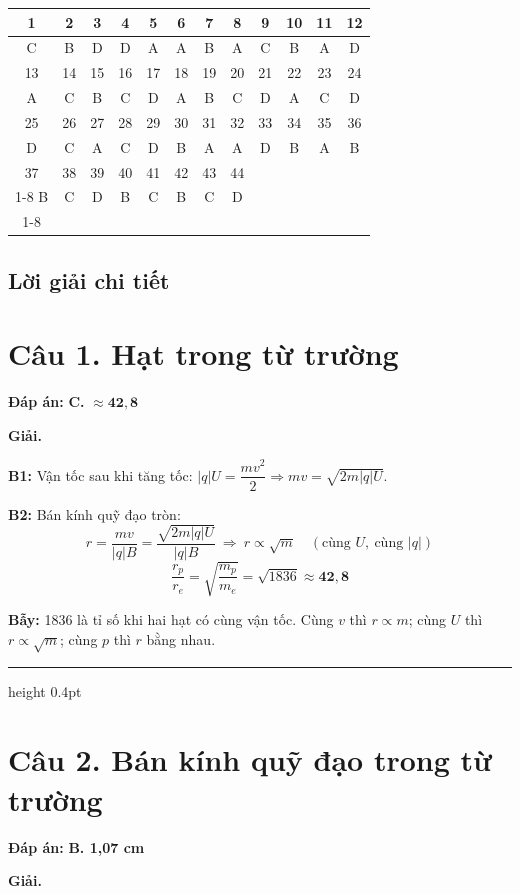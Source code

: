 \documentclass[11pt,a4paper]{article}
\renewcommand{\boldsymbol}[1]{\symbf{#1}}
\newcommand{\Cau}[2]{\par\Needspace{7\baselineskip}\section*{Câu #1. #2}}
\newcommand{\DapAn}[1]{\textbf{Đáp án:} #1\par}
\newcommand{\Bay}[1]{\par\textbf{Bẫy:} #1\par}
\newcommand{\PhanCachBai}{%
  \par\Needspace{7\baselineskip}%
  \addvspace{6pt}%
  {\color{black!40}\hrule height 0.4pt}%
  \nobreak\vspace{7pt}\nobreak
}
\begin{document}
\begin{center}
\renewcommand{\arraystretch}{1.35}
\setlength{\tabcolsep}{5pt}
\begin{tabular}{|c|c|c|c|c|c|c|c|c|c|c|c|}
\hline
1 & 2 & 3 & 4 & 5 & 6 & 7 & 8 & 9 & 10 & 11 & 12 \\ \hline
C & B & D & D & A & A & B & A & C & B & A & D \\ \hline\hline
13 & 14 & 15 & 16 & 17 & 18 & 19 & 20 & 21 & 22 & 23 & 24 \\ \hline
A & C & B & C & D & A & B & C & D & A & C & D \\ \hline\hline
25 & 26 & 27 & 28 & 29 & 30 & 31 & 32 & 33 & 34 & 35 & 36 \\ \hline
D & C & A & C & D & B & A & A & D & B & A & B \\ \hline\hline
37 & 38 & 39 & 40 & 41 & 42 & 43 & 44 & \multicolumn{4}{c}{} \\ \cline{1-8}
B & C & D & B & C & B & C & D & \multicolumn{4}{c}{} \\ \cline{1-8}
\end{tabular}
\end{center}

\subsection*{Lời giải chi tiết}

\Cau{1}{Hạt trong từ trường}
\DapAn{\textbf{C.} $\boldsymbol{\approx42{,}8}$}

\textbf{Giải.}

\textbf{B1:} Vận tốc sau khi tăng tốc: $|q|U=\dfrac{mv^2}{2}\Rightarrow mv=\sqrt{2m|q|U}$.

\textbf{B2:} Bán kính quỹ đạo tròn:
\begin{equation*}
    r=\frac{mv}{|q|B}=\frac{\sqrt{2m|q|U}}{|q|B}\ \Longrightarrow\ r\propto\sqrt m\quad(\text{cùng }U,\ \text{cùng }|q|)
\end{equation*}
\begin{equation*}
    \frac{r_p}{r_e}=\sqrt{\frac{m_p}{m_e}}=\sqrt{1836}\approx\boldsymbol{42{,}8}
\end{equation*}
\Bay{1836 là tỉ số khi hai hạt có cùng vận tốc. Cùng $v$ thì $r\propto m$; cùng $U$ thì $r\propto\sqrt m$; cùng $p$ thì $r$ bằng nhau.}

\PhanCachBai
\Cau{2}{Bán kính quỹ đạo trong từ trường}
\DapAn{\textbf{B. 1,07 cm}}

\textbf{Giải.}
\end{document}
